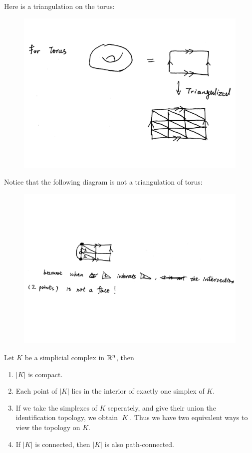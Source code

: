 \begin{ex}
    Here is a triangulation on the torus:
    \begin{figure}[H]
        \centering
        \includegraphics[width=0.6\linewidth]{pics/ch6-scanned-notes-1/p5.pdf}
    \end{figure}
    Notice that the following diagram is not a triangulation of torus:
    \begin{figure}[H]
        \centering
        \includegraphics[width=0.8\linewidth]{pics/ch6-scanned-notes-1/p52.pdf}
    \end{figure}
\end{ex}
\begin{lemma}
    Let $K$ be a simplicial complex in $\mathbb{R}^{n}$, then
    \begin{enumerate}
        \item $|K|$ is compact.
        \item Each point of $|K|$ lies in the interior of exactly one
            simplex of $K$.
        \item If we take the simplexes of $K$ seperately, and give
            their union the identification topology, we obtain $|K|$.
            Thus we have two equivalent ways to view the topology on
            $K$.
        \item If $|K|$ is connected, then $|K|$ is also
            path-connected.
    \end{enumerate}
\end{lemma}

